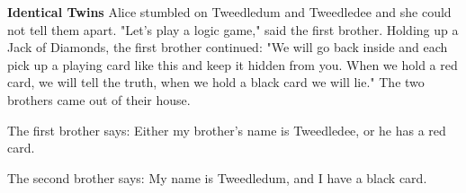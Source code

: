 \documentclass{article}
\begin{document}
\noindent \textbf{Identical Twins}
Alice stumbled on Tweedledum and Tweedledee and she could not tell them apart. "Let's play a logic game," said the first brother. Holding up a Jack of Diamonds, the first brother continued: "We will go back inside and each pick up a playing card like this and keep it hidden from you. When we hold a red card, we will tell the truth, when we hold a black card we will lie." 
The two brothers came out of their house.

\noindent
The first brother says: Either my brother's name is Tweedledee, or he has a red card.

\noindent
The second brother says: My name is Tweedledum, and I have a black card.
\end{document}
